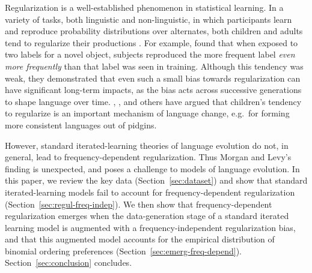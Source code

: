 \documentclass{evolang11}
\begin{document}

Regularization is a well-established phenomenon in statistical learning. In a variety of tasks, both linguistic and non-linguistic, in which participants learn and reproduce probability distributions over alternates, both children and adults tend to regularize their productions \cite{HudsonKam:2005we,Reali:2009dp,FERDINAND:2014tk}. For example,  found that when exposed to two labels for a novel object, subjects reproduced the more frequent label \emph{even more frequently} than that label was seen in training. Although this tendency was weak, they demonstrated that even such a small bias towards regularization can have significant long-term impacts, as the bias acts across successive generations to shape language over time.  , , and others have argued that children's tendency to regularize is an important mechanism of language change, e.g.\ for forming more consistent languages out of pidgins.

However, standard iterated-learning theories of language evolution do not, in general, lead to frequency-dependent regularization.  Thus Morgan and Levy's finding is unexpected, and poses a challenge to models of language evolution. In this paper, we review the key data (Section~\ref{sec:dataset}) and show that standard iterated-learning models fail to account for frequency-dependent regularization (Section~\ref{sec:regul-freq-indep}). We then show that frequency-dependent regularization emerges when the data-generation stage of a standard iterated learning model is augmented with a frequency-independent regularization bias, and that this augmented model accounts for the empirical distribution of binomial ordering preferences (Section~\ref{sec:emerg-freq-depend}). Section~\ref{sec:conclusion} concludes.
\end{document}
